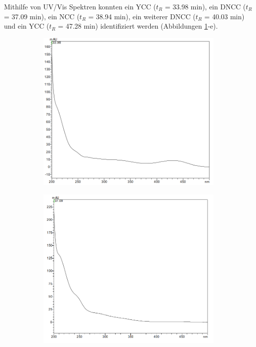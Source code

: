 \pagebreak
Mithilfe von UV/Vis Spektren konnten ein YCC ($t_R$ = 33.98 min), ein DNCC ($t_R$ = 37.09 min), ein NCC ($t_R$ = 38.94 min), ein weiterer DNCC ($t_R$ = 40.03 min) und ein YCC ($t_R$ = 47.28 min) identifiziert werden (Abbildungen \ref{fig:YCC3398}-e). 

\begin{figure}[!htbp]
  \begin{subfigure}[b]{0.5\textwidth}
    \includegraphics[width=\textwidth]{figures/Kapitel6/Reaktion3h/YCC3398.png}
    \caption{}
    \label{fig:YCC3398}
  \end{subfigure}
  \hfill
  \begin{subfigure}[b]{0.5\textwidth}
    \includegraphics[width=\textwidth]{figures/Kapitel6/Reaktion3h/DNCC3709.png}
    \caption{}
    \label{fig:DNCC3709}
  \end{subfigure}
  

\end{figure}
